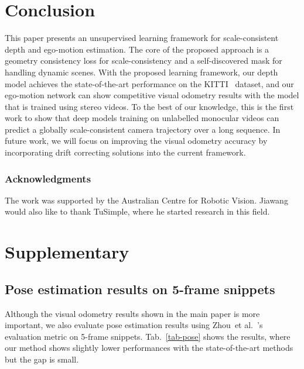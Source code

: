 \documentclass{article}
\newcommand{\tabref}[1]{Tab.~\ref{#1}}
\def\etal{et al.}
\begin{document}
\section{Conclusion}
This paper presents an unsupervised learning framework for scale-consistent depth and ego-motion estimation.
The core of the proposed approach is a geometry consistency loss for scale-consistency and a self-discovered mask for handling dynamic scenes.
With the proposed learning framework, our depth model achieves the state-of-the-art performance on the KITTI~\cite{Geiger2013IJRR} dataset,
and our ego-motion network can show competitive visual odometry results with the model that is trained using stereo videos.
To the best of our knowledge, this is the first work to show that deep models training on unlabelled monocular videos can predict a globally scale-consistent camera trajectory over a long sequence.
In future work, we will focus on improving the visual odometry accuracy by incorporating drift correcting solutions into the current framework.

\subsubsection*{Acknowledgments}
The work was supported by the Australian Centre for Robotic Vision.
Jiawang would also like to thank TuSimple, where he started research in this field.





\section{Supplementary}

\subsection{Pose estimation results on 5-frame snippets}

Although the visual odometry results shown in the main paper is more important, 
we also evaluate pose estimation results using Zhou~\etal~\cite{zhou2017unsupervised}'s evaluation metric on 5-frame snippets.
\tabref{tab-pose} shows the results, where our method shows slightly lower performances with the state-of-the-art methods but the gap is small.
\end{document}
